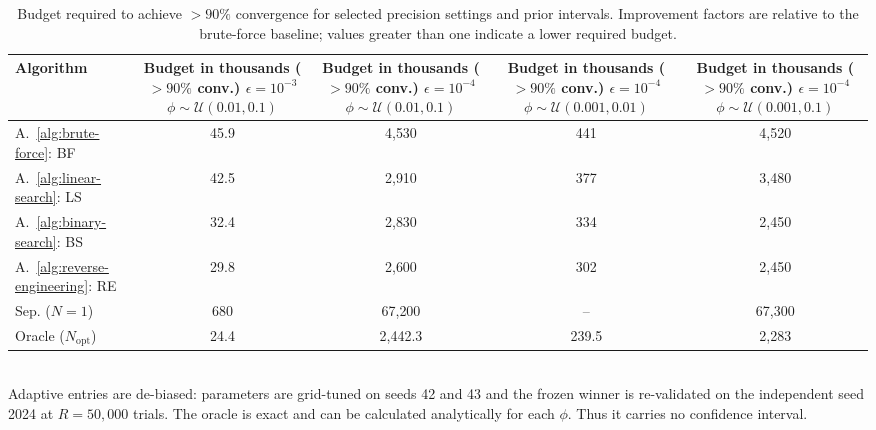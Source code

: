 \begin{table}[ht]
\centering
\scriptsize
\caption{Budget required to achieve $>90\%$ convergence for selected precision settings and prior intervals. Improvement factors are relative to the brute-force baseline; values greater than one indicate a lower required budget.}
\label{tab:summary-all}
\begin{tabular}{l c c c c}
\toprule
Algorithm
& \makecell{Budget in thousands\\ ($>90\%$ conv.) \\ $\epsilon={10^{-3}}$ \\ $\phi \sim \mathcal{U}(0.01,0.1)$}
& \makecell{Budget in thousands\\ ($>90\%$ conv.) \\ $\epsilon={10^{-4}}$ \\ $\phi \sim \mathcal{U}(0.01,0.1)$}
& \makecell{Budget in thousands\\ ($>90\%$ conv.) \\ $\epsilon={10^{-4}}$ \\ $\phi \sim \mathcal{U}(0.001,0.01)$}
& \makecell{Budget in thousands\\ ($>90\%$ conv.) \\ $\epsilon={10^{-4}}$ \\ $\phi \sim \mathcal{U}(0.001,0.1)$} \\
\midrule
A.~\ref{alg:brute-force}: BF
& 45.9
& 4{,}530
& 441
& 4{,}520 \\
A.~\ref{alg:linear-search}: LS
& 42.5
& 2{,}910
& 377
& 3{,}480 \\
A.~\ref{alg:binary-search}: BS
& 32.4
& 2{,}830
& 334
& 2{,}450 \\
A.~\ref{alg:reverse-engineering}: RE
& 29.8
& 2{,}600
& 302
& 2{,}450 \\
\midrule
Sep. ($N=1$)
& 680
& 67{,}200
& --
& 67{,}300 \\
\midrule
Oracle ($N_\text{opt}$)
& 24.4
& 2{,}442.3
& 239.5
& 2{,}283 \\
\bottomrule
\end{tabular}
\\[2pt]
\footnotesize Adaptive entries are de-biased: parameters are grid-tuned on seeds 42 and 43 and the frozen winner is re-validated on the independent seed 2024 at $R=50{,}000$ trials. The oracle is exact and can be calculated analytically for each $\phi$. Thus it carries no confidence interval.
\end{table}
